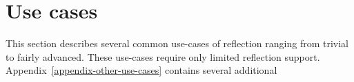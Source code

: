 \section{Use cases}
\label{section-use-cases}

This section describes several common use-cases of reflection ranging from trivial to fairly advanced.
These use-cases require only limited reflection support. Appendix~\ref{appendix-other-use-cases} contains
several additional 








